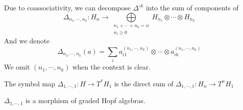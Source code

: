 \begin{definition}
Due to coassociativity, we can decompose $\Delta^{\circ k}$ into the sum of components of 
\[
\Delta_{n_1,\cdots,n_k}:H_n\to\bigoplus\limits_{\substack{n_1+\cdots+n_k=n\\n_i\geq0}}H_{n_1}\otimes\cdots\otimes H_{n_k}
\]
And we denote
\begin{equation}
\Delta_{n_1,\cdots,n_k}(a)=\sum_{i}a^{(n_1,\cdots,n_k)}_{i1}\otimes\cdots\otimes a^{(n_1,\cdots,n_k)}_{ik}
\end{equation}
We omit $(n_1,\cdots,n_k)$ when the context is clear.
\end{definition}

\begin{definition}
The symbol map $\Delta_{1,\cdots,1}:H\to T^*H_1$ is the direct sum of $\Delta_{1,\cdots,1}:H_n\to T^nH_1$
\end{definition}

\begin{proposition}
$\Delta_{1,\cdots,1}$ is a morphism of graded Hopf algebras.
\end{proposition}

